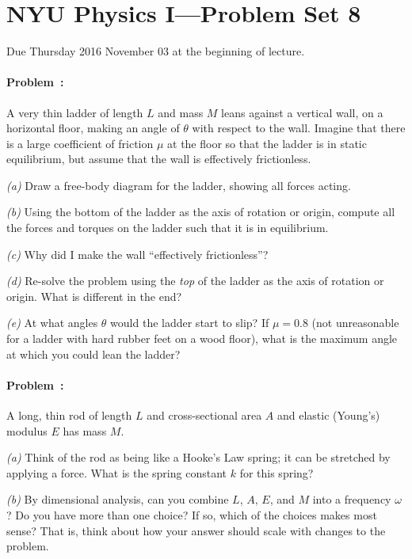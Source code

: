 \documentclass[12pt]{article}
\begin{document}
\section*{NYU Physics I---Problem Set 8}

Due Thursday 2016 November 03 at the beginning of lecture.

\paragraph{Problem~\theproblem:}%
A very thin ladder of length $L$ and mass $M$ leans against a vertical
wall, on a horizontal floor, making an angle of $\theta$ with respect
to the wall.  Imagine that there is a large coefficient of friction
$\mu$ at the floor so that the ladder is in static
equilibrium, but assume that the wall is effectively frictionless.

\textsl{(a)} Draw a free-body diagram for the ladder, showing all
forces acting.

\textsl{(b)} Using the bottom of the ladder as the axis of rotation or
origin, compute all the forces and torques on the ladder such that it
is in equilibrium.

\textsl{(c)} Why did I make the wall ``effectively frictionless''?

\textsl{(d)} Re-solve the problem using the \emph{top} of the ladder
as the axis of rotation or origin.  What is different in the end?

\textsl{(e)} At what angles $\theta$ would the ladder start to slip?
If $\mu=0.8$ (not unreasonable for a ladder with hard rubber feet on a wood
floor), what is the maximum angle at which you could lean the ladder?

\paragraph{Problem~\theproblem:}%
A long, thin rod of length $L$ and cross-sectional area $A$ and
elastic (Young's) modulus $E$ has mass $M$.

\textsl{(a)} Think of the rod as being like a Hooke's Law spring; it
can be stretched by applying a force.  What is the spring constant $k$
for this spring?

\textsl{(b)} By dimensional analysis, can you combine $L$, $A$, $E$,
and $M$ into a frequency $\omega$?  Do you have more than one choice?  If so,
which of the choices makes most sense? That is, think about how your
answer should scale with changes to the problem.
\end{document}
